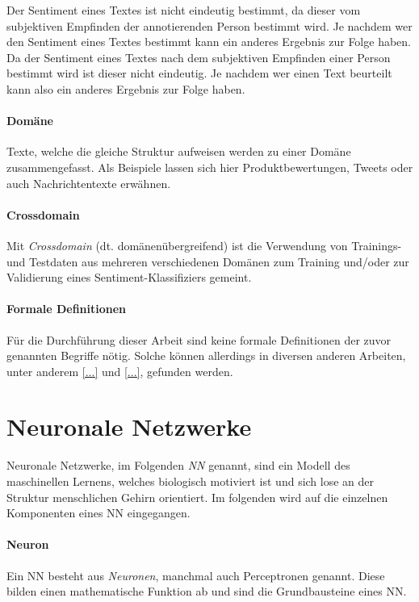 Der Sentiment eines Textes ist nicht eindeutig bestimmt, da dieser vom subjektiven Empfinden der annotierenden Person bestimmt wird. Je nachdem wer den Sentiment eines Textes bestimmt kann ein anderes Ergebnis zur Folge haben.
Da der Sentiment eines Textes nach dem subjektiven Empfinden einer Person bestimmt wird ist dieser nicht eindeutig. Je nachdem wer einen Text beurteilt kann also ein anderes Ergebnis zur Folge haben.

\paragraph{Domäne} Texte, welche die gleiche Struktur aufweisen werden zu einer Domäne zusammengefasst. Als Beispiele lassen sich hier Produktbewertungen, Tweets oder auch Nachrichtentexte erwähnen.

\paragraph{Crossdomain} 
Mit \emph{Crossdomain} (dt. domänenübergreifend) ist die Verwendung von Trainings- und Testdaten aus mehreren verschiedenen Domänen zum Training und/oder zur Validierung eines Sentiment-Klassifiziers gemeint.

\paragraph{Formale Definitionen}

Für die Durchführung dieser Arbeit sind keine formale Definitionen der zuvor genannten Begriffe nötig. Solche können allerdings in diversen anderen Arbeiten, unter anderem \ref{...} und \ref{...}, gefunden werden.

\section{Neuronale Netzwerke}
\label{basics:neural_network}

Neuronale Netzwerke, im Folgenden \emph{\gls{NN}} genannt, sind ein Modell des maschinellen Lernens, welches biologisch motiviert ist und sich lose an der Struktur menschlichen Gehirn orientiert. Im folgenden wird auf die einzelnen Komponenten eines NN eingegangen.

\paragraph{Neuron}\label{basic:neural_network:neuron} Ein NN besteht aus \emph{Neuronen}, manchmal auch Perceptronen genannt. Diese bilden einen mathematische Funktion ab und sind die Grundbausteine eines NN.

